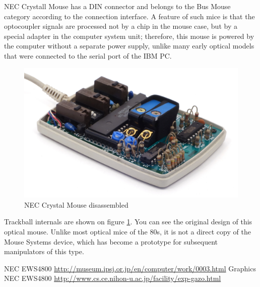 \documentclass[11pt, a4paper]{article}
\begin{document}
NEC Crystall Mouse has a DIN connector and belongs to the Bus Mouse category according to the connection interface. A feature of such mice is that the optocoupler signals are processed not by a chip in the mouse case, but by a special adapter in the computer system unit; therefore, this mouse is powered by the computer without a separate power supply, unlike many early optical models that were connected to the serial port of the IBM PC.

\begin{figure}[h]
    \centering
    \includegraphics[scale=0.8]{1986_nec_crystal_mouse/necraz_60.jpg}
    \caption{NEC Crystal Mouse disassembled}
    \label{fig:NecCrystalInside}
\end{figure}

Trackball internals are shown on figure \ref{fig:NecCrystalInside}. You can see the original design of this optical mouse. Unlike most optical mice of the 80s, it is not a direct copy of the Mouse Systems device, which has become a prototype for subsequent manipulators of this type.

\begin{thebibliography}{9}
 NEC EWS4800 \url{http://museum.ipsj.or.jp/en/computer/work/0003.html}
 Graphics NEC EWS4800 \url{http://www.cs.ce.nihon-u.ac.jp/facility/exp-gazo.html}
\end{thebibliography}
\end{document}
